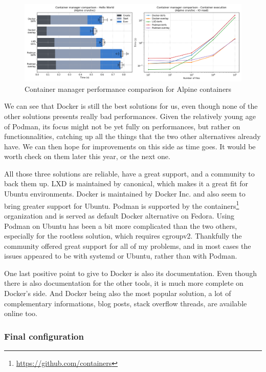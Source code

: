 \begin{figure}[h!]
  \begin{center}
    \includegraphics[width=\linewidth]{images/question-1-manager.png}
    \caption{Container manager performance comparison for Alpine containers}
    \label{fig:q1:manager}
  \end{center}
\end{figure}

We can see that Docker is still the best solutions for us, even though none of the other solutions presents really bad performances.  Given the relatively young age of Podman, its focus might not be yet fully on performances, but rather on functionnalities, catching up all the things that the two other alternatives already have.  We can then hope for improvements on this side as time goes.  It would be worth check on them later this year, or the next one.  

All those three solutions are reliable, have a great support, and a community to back them up.  LXD is maintained by canonical, which makes it a great fit for Ubuntu environments.  Docker is maintained by Docker Inc. and also seem to bring greater support for Ubuntu.  Podman is supported by the containers\footnote{\href{https://github.com/containers}{https://github.com/containers}} organization and is served as default Docker alternative on Fedora.  Using Podman on Ubuntu has been a bit more complicated than the two others, especially for the rootless solution, which requires cgroupv2.  Thankfully the community offered great support for all of my problems, and in most cases the issues appeared to be with systemd or Ubuntu, rather than with Podman.

One last positive point to give to Docker is also its documentation.  Even though there is also documentation for the other tools, it is much more complete on Docker's side.  And Docker being also the most popular solution, a lot of complementary informations, blog posts, stack overflow threads, are available online too.

\subsubsection{Final configuration}

